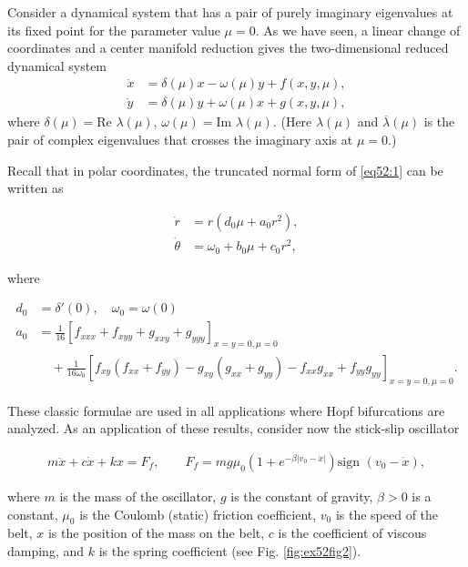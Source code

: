 \begin{exercise}
Consider a dynamical system that has a pair of purely imaginary eigenvalues at its fixed point for the parameter value $\mu=0$. As we have seen, a linear change of coordinates and a center manifold reduction gives the two-dimensional reduced dynamical system
\begin{align}
\label{eq52:1}
\dot{x} &= \delta(\mu)x - \omega(\mu)y + f(x, y, \mu), \\
\dot{y} &= \delta(\mu)y+\omega(\mu)x + g(x,y,\mu),
\end{align}
where $\delta(\mu)=\text{Re }\lambda(\mu)$, $\omega(\mu) = \text{Im }\lambda(\mu)$. (Here $\lambda(\mu)$ and $\overline{\lambda}(\mu)$ is the pair of complex eigenvalues that crosses the imaginary axis at $\mu=0$.)

Recall that in polar coordinates, the truncated normal form of \eqref{eq52:1} can be written as

\begin{align}
\dot{r} &= r(d_0\mu + a_0 r^2), \\
\dot{\theta} &= \omega_0 + b_0\mu + c_0r^2,
\end{align}

where

\begin{align}
d_0 &= \delta'(0), \quad \omega_0 = \omega(0) \\
a_0 &= \frac{1}{16}\left[f_{xxx}+f_{xyy}+g_{xxy}+g_{yyy} \right]_{x=y=0,\mu=0} \\
	&\quad+ \frac{1}{16\omega_0}\left[f_{xy}(f_{xx}+f_{yy}) - g_{xy}(g_{xx} + g_{yy}) - f_{xx}g_{xx}+f_{yy}g_{yy} \right]_{x=y=0, \mu=0}.
\end{align}

These classic formulae are used in all applications where Hopf bifurcations are analyzed. As an application of these results, consider now the stick-slip oscillator

\begin{align}
m\ddot{x}+c\dot{x}+kx=F_f, \qquad F_f=mg\mu_0\left(1+e^{-\beta |v_0-\dot{x}|} \right)\text{sign }(v_0-\dot{x}),
\end{align}

where $m$ is the mass of the oscillator, $g$ is the constant of gravity, $\beta>0$ is a constant, $\mu_0$ is the Coulomb (static) friction coefficient, $v_0$ is the speed of the belt, $x$ is the position of the mass on the belt, $c$ is the coefficient of viscous damping, and $k$ is the spring coefficient (see Fig. \ref{fig:ex52fig2}).


\end{exercise}
